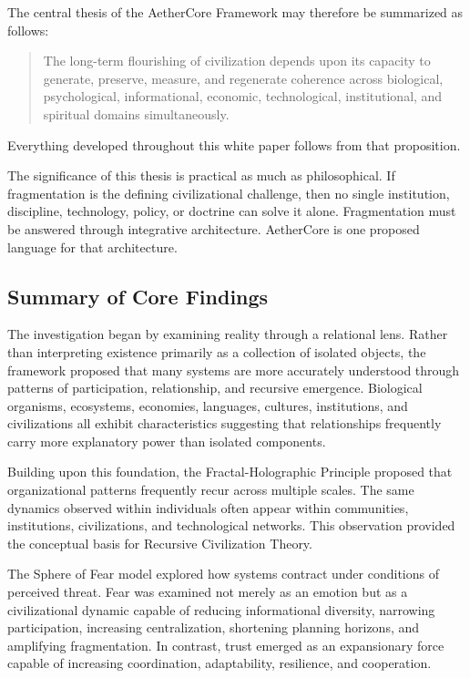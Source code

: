 \documentclass[12pt]{article}
\begin{document}
The central thesis of the AetherCore Framework may therefore be summarized as follows:

\begin{quote}
The long-term flourishing of civilization depends upon its capacity to generate, preserve, measure, and regenerate coherence across biological, psychological, informational, economic, technological, institutional, and spiritual domains simultaneously.
\end{quote}

Everything developed throughout this white paper follows from that proposition.

The significance of this thesis is practical as much as philosophical. If fragmentation is the defining civilizational challenge, then no single institution, discipline, technology, policy, or doctrine can solve it alone. Fragmentation must be answered through integrative architecture. AetherCore is one proposed language for that architecture.

\subsection{Summary of Core Findings}

The investigation began by examining reality through a relational lens. Rather than interpreting existence primarily as a collection of isolated objects, the framework proposed that many systems are more accurately understood through patterns of participation, relationship, and recursive emergence. Biological organisms, ecosystems, economies, languages, cultures, institutions, and civilizations all exhibit characteristics suggesting that relationships frequently carry more explanatory power than isolated components.

Building upon this foundation, the Fractal-Holographic Principle proposed that organizational patterns frequently recur across multiple scales. The same dynamics observed within individuals often appear within communities, institutions, civilizations, and technological networks. This observation provided the conceptual basis for Recursive Civilization Theory.

The Sphere of Fear model explored how systems contract under conditions of perceived threat. Fear was examined not merely as an emotion but as a civilizational dynamic capable of reducing informational diversity, narrowing participation, increasing centralization, shortening planning horizons, and amplifying fragmentation. In contrast, trust emerged as an expansionary force capable of increasing coordination, adaptability, resilience, and cooperation.
\end{document}
